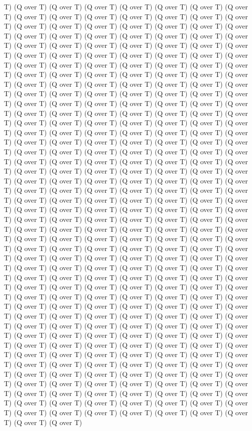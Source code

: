 T) (Q over T) (Q over T) (Q over T) (Q over T) (Q over T) (Q over T) (Q over T) (Q over T) (Q over T) (Q over T) (Q over T) (Q over T) (Q over T) (Q over T) (Q over T) (Q over T) (Q over T) (Q over T) (Q over T) (Q over T) (Q over T) (Q over T) (Q over T) (Q over T) (Q over T) (Q over T) (Q over T) (Q over T) (Q over T) (Q over T) (Q over T) (Q over T) (Q over T) (Q over T) (Q over T) (Q over T) (Q over T) (Q over T) (Q over T) (Q over T) (Q over T) (Q over T) (Q over T) (Q over T) (Q over T) (Q over T) (Q over T) (Q over T) (Q over T) (Q over T) (Q over T) (Q over T) (Q over T) (Q over T) (Q over T) (Q over T) (Q over T) (Q over T) (Q over T) (Q over T) (Q over T) (Q over T) (Q over T) (Q over T) (Q over T) (Q over T) (Q over T) (Q over T) (Q over T) (Q over T) (Q over T) (Q over T) (Q over T) (Q over T) (Q over T) (Q over T) (Q over T) (Q over T) (Q over T) (Q over T) (Q over T) (Q over T) (Q over T) (Q over T) (Q over T) (Q over T) (Q over T) (Q over T) (Q over T) (Q over T) (Q over T) (Q over T) (Q over T) (Q over T) (Q over T) (Q over T) (Q over T) (Q over T) (Q over T) (Q over T) (Q over T) (Q over T) (Q over T) (Q over T) (Q over T) (Q over T) (Q over T) (Q over T) (Q over T) (Q over T) (Q over T) (Q over T) (Q over T) (Q over T) (Q over T) (Q over T) (Q over T) (Q over T) (Q over T) (Q over T) (Q over T) (Q over T) (Q over T) (Q over T) (Q over T) (Q over T) (Q over T) (Q over T) (Q over T) (Q over T) (Q over T) (Q over T) (Q over T) (Q over T) (Q over T) (Q over T) (Q over T) (Q over T) (Q over T) (Q over T) (Q over T) (Q over T) (Q over T) (Q over T) (Q over T) (Q over T) (Q over T) (Q over T) (Q over T) (Q over T) (Q over T) (Q over T) (Q over T) (Q over T) (Q over T) (Q over T) (Q over T) (Q over T) (Q over T) (Q over T) (Q over T) (Q over T) (Q over T) (Q over T) (Q over T) (Q over T) (Q over T) (Q over T) (Q over T) (Q over T) (Q over T) (Q over T) (Q over T) (Q over T) (Q over T) (Q over T) (Q over T) (Q over T) (Q over T) (Q over T) (Q over T) (Q over T) (Q over T) (Q over T) (Q over T) (Q over T) (Q over T) (Q over T) (Q over T) (Q over T) (Q over T) (Q over T) (Q over T) (Q over T) (Q over T) (Q over T) (Q over T) (Q over T) (Q over T) (Q over T) (Q over T) (Q over T) (Q over T) (Q over T) (Q over T) (Q over T) (Q over T) (Q over T) (Q over T) (Q over T) (Q over T) (Q over T) (Q over T) (Q over T) (Q over T) (Q over T) (Q over T) (Q over T) (Q over T) (Q over T) (Q over T) (Q over T) (Q over T) (Q over T) (Q over T) (Q over T) (Q over T) (Q over T) (Q over T) (Q over T) (Q over T) (Q over T) (Q over T) (Q over T) (Q over T) (Q over T) (Q over T) (Q over T) (Q over T) (Q over T) (Q over T) (Q over T) (Q over T) (Q over T) (Q over T) (Q over T) (Q over T) (Q over T) (Q over T) (Q over T) (Q over T) (Q over T) (Q over T) (Q over T) (Q over T) (Q over T) (Q over T) (Q over T) (Q over T) (Q over T) (Q over T) (Q over T) (Q over T) (Q over T) (Q over T) (Q over T) (Q over T) (Q over T) (Q over T) (Q over T) (Q over T) (Q over T) (Q over T) (Q over T) (Q over T) (Q over T) (Q over T) (Q over T) (Q over T) (Q over T) (Q over T) (Q over T) (Q over T) (Q over T) (Q over T) (Q over T) (Q over T) (Q over T) (Q over T) (Q over T) (Q over T) (Q over T) (Q over T) (Q over T) (Q over T) (Q over T) (Q over T) (Q over T) (Q over T) (Q over T) (Q over T) (Q over T) (Q over T) 
